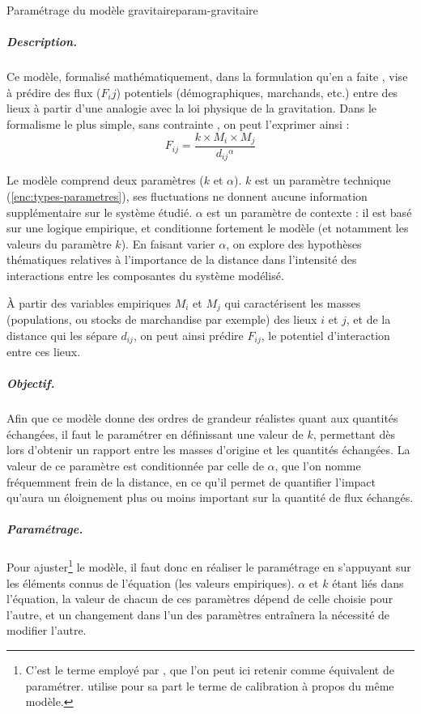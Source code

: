 \begin{encadre}{Paramétrage du modèle gravitaire}{param-gravitaire}
	\renewcommand{\thempfootnote}{\alph{mpfootnote}}
\subparagraph{Description.}
Ce modèle, formalisé mathématiquement,
dans la formulation qu'en a faite \textcite{stewart_demographic_1948}, vise à prédire des flux ($F_ij$) potentiels (démographiques, marchands, etc.) entre des lieux à partir d'une analogie avec la loi physique de la gravitation.
Dans le formalisme le plus simple, \og sans contrainte\fg{} \autocite{pumain_les_2001}, on peut l'exprimer ainsi :
\begin{equation*}
F_{ij} = \frac{k \times M_{i} \times M_{j}}{d_{ij}{}^\alpha}
\end{equation*}

Le modèle comprend deux paramètres ($k$ et $\alpha$).
$k$ est un paramètre technique (\cref{enc:types-parametres}), ses fluctuations ne donnent aucune information supplémentaire sur le système étudié.
$\alpha$ est un paramètre de contexte : il est basé sur une logique empirique, et conditionne fortement le modèle (et notamment les valeurs du paramètre $k$).
En faisant varier $\alpha$, on explore des hypothèses thématiques relatives à l'importance de la distance dans l'intensité des interactions entre les composantes du système modélisé.

À partir des variables empiriques $M_i$ et $M_j$ qui caractérisent les masses (populations, ou stocks de marchandise par exemple) des lieux $i$ et $j$, et de la distance qui les sépare $d_{ij}$, on peut ainsi prédire $F_{ij}$, le potentiel d'interaction entre ces lieux.

\subparagraph{Objectif.}
Afin que ce modèle donne des ordres de grandeur réalistes quant aux quantités échangées, il faut le paramétrer en définissant une valeur de $k$, permettant dès lors d'obtenir un rapport entre les masses d'origine et les quantités échangées.
La valeur de ce paramètre est conditionnée par celle de $\alpha$, que l'on nomme fréquemment \og frein de la distance\fg{}, en ce qu'il permet de quantifier l'impact qu'aura un éloignement plus ou moins important sur la quantité de flux échangés.

\subparagraph{Paramétrage.}
Pour \og ajuster\fg{}\footnote{
	C'est le terme employé par \textcite{pumain_les_2001}, que l'on peut ici retenir comme équivalent de paramétrer.
	\textcite[298]{durand1995modeles} utilise pour sa part le terme de calibration à propos du même modèle.
} le modèle, il faut donc en réaliser le paramétrage en s'appuyant sur les éléments connus de l'équation (les valeurs empiriques).
$\alpha$ et $k$ étant liés dans l'équation, la valeur de chacun de ces paramètres dépend de celle choisie pour l'autre, et un changement dans l'un des paramètres entraînera la nécessité de modifier l'autre.


\end{encadre}

